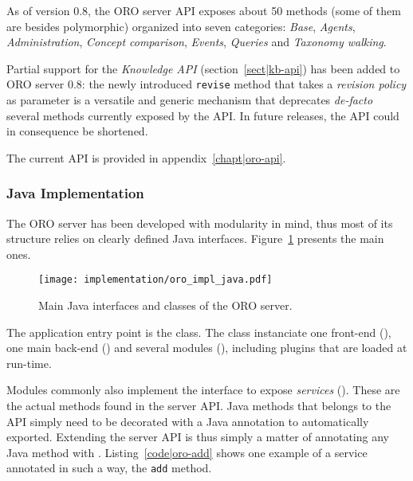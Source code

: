 As of version 0.8, the ORO server API exposes about 50 methods (some of them
are besides polymorphic) organized into seven categories: \emph{Base}, \emph{Agents},
\emph{Administration}, \emph{Concept comparison}, \emph{Events}, \emph{Queries}
and \emph{Taxonomy walking}.

Partial support for the \emph{Knowledge API} (section~\ref{sect|kb-api}) has
been added to ORO server 0.8: the newly introduced {\tt revise} method that
takes a \emph{revision policy} as parameter is a versatile and generic
mechanism that deprecates {\it de-facto} several methods currently exposed by
the API. In future releases, the API could in consequence be shortened.

The current API is provided in appendix~\ref{chapt|oro-api}.

\subsubsection{Java Implementation}
\label{sect|java-impl}

The ORO server has been developed with modularity in mind, thus most of its
structure relies on clearly defined Java interfaces.
Figure~\ref{fig|oro-impl-java} presents the main ones.

\begin{figure}
    \centering
    \texttt{[image: implementation/oro\_impl\_java.pdf]}
    \caption{Main Java interfaces and classes of the ORO server.}
    \label{fig|oro-impl-java}
\end{figure}

The application entry point is the  class. The class
instanciate one front-end (), one main back-end
() and several modules (),
including plugins that are loaded at run-time.

Modules commonly also implement the  interface to
expose \emph{services} (). These are the actual methods found
in the server API. Java methods that belongs to the API simply need to be
decorated with a  Java annotation to automatically
exported. Extending the server API is thus simply a matter of annotating any
Java method with . Listing~\ref{code|oro-add} shows one
example of a service annotated in such a way, the {\tt add} method.

